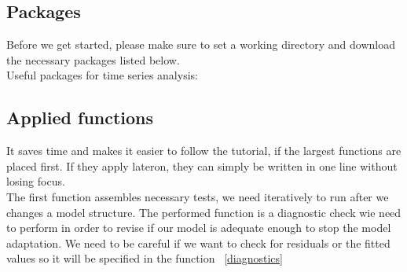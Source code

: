 \documentclass[11pt, a4paper]{article} %
\begin{document}
\subsection{Packages}
Before we get started, please make sure to set a working directory and download the necessary packages listed below.\\
\noindent Useful packages for time series analysis:
\begin{Schunk}
\end{Schunk}


\subsection{Applied functions}
\noindent It saves time and makes it easier to follow the tutorial, if the largest functions are placed first. If they apply lateron, they can simply be written in one line without losing focus. \\
The first function assembles necessary tests, we need iteratively to run after we changes a model structure.  The performed function is a diagnostic check wie need to perform in order to revise if our model is adequate enough to stop the model adaptation. We need to be careful if we want to check for residuals or the fitted values so it will be specified in the function ~\ref{diagnostics}
\\
\end{document}
